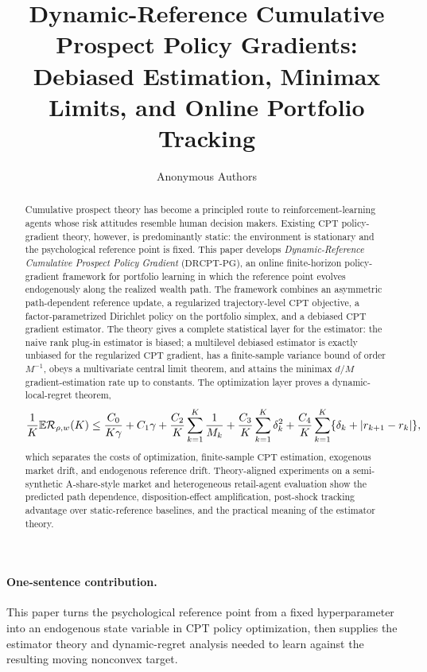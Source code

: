 \documentclass[11pt]{article}
\title{Dynamic-Reference Cumulative Prospect Policy Gradients:\\Debiased Estimation, Minimax Limits, and Online Portfolio Tracking}
\author{Anonymous Authors}
\date{}
\newcommand{\E}{\mathbb E}
\newcommand{\1}{\mathbf 1}
\DeclarePairedDelimiter{\abs}{\lvert}{\rvert}
\newcommand{\CPT}{\ensuremath{\mathrm{CPT}}\xspace}
\newcommand{\DRCPTPG}{\ensuremath{\mathrm{DRCPT\mbox{-}PG}}\xspace}
\newcommand{\Reg}{\mathcal R}
\begin{document}
\maketitle

\begin{abstract}
Cumulative prospect theory has become a principled route to reinforcement-learning agents whose risk attitudes resemble human decision makers.  Existing 
\CPT policy-gradient theory, however, is predominantly static: the environment is stationary and the psychological reference point is fixed.  This paper develops \emph{Dynamic-Reference Cumulative Prospect Policy Gradient} (\DRCPTPG), an online finite-horizon policy-gradient framework for portfolio learning in which the reference point evolves endogenously along the realized wealth path.  The framework combines an asymmetric path-dependent reference update, a regularized trajectory-level \CPT objective, a factor-parametrized Dirichlet policy on the portfolio simplex, and a debiased \CPT gradient estimator.  The theory gives a complete statistical layer for the estimator: the naive rank plug-in estimator is biased; a multilevel debiased estimator is exactly unbiased for the regularized \CPT gradient, has a finite-sample variance bound of order $M^{-1}$, obeys a multivariate central limit theorem, and attains the minimax $d/M$ gradient-estimation rate up to constants.  The optimization layer proves a dynamic-local-regret theorem,
\[
 {1\over K}\E \Reg_{\rho,w}(K)
 \le {C_0\over K\gamma}+C_1\gamma
 +{C_2\over K}\sum_{k=1}^{K}{1\over M_k}
 +{C_3\over K}\sum_{k=1}^{K}\delta_k^2
 +{C_4\over K}\sum_{k=1}^{K}\{\delta_k+\abs{r_{k+1}-r_k}\},
\]
which separates the costs of optimization, finite-sample \CPT estimation, exogenous market drift, and endogenous reference drift.  Theory-aligned experiments on a semi-synthetic A-share-style market and heterogeneous retail-agent evaluation show the predicted path dependence, disposition-effect amplification, post-shock tracking advantage over static-reference baselines, and the practical meaning of the estimator theory.
\end{abstract}

\paragraph{One-sentence contribution.}
This paper turns the psychological reference point from a fixed hyperparameter into an endogenous state variable in \CPT policy optimization, then supplies the estimator theory and dynamic-regret analysis needed to learn against the resulting moving nonconvex target.
\end{document}
